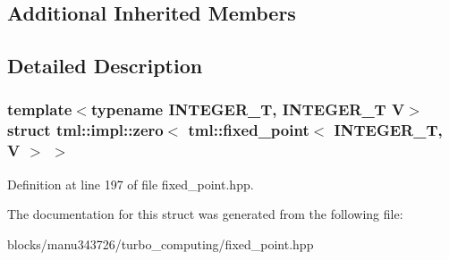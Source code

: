 \subsection*{Additional Inherited Members}


\subsection{Detailed Description}
\subsubsection*{template$<$typename I\+N\+T\+E\+G\+E\+R\+\_\+\+T, I\+N\+T\+E\+G\+E\+R\+\_\+\+T V$>$struct tml\+::impl\+::zero$<$ tml\+::fixed\+\_\+point$<$ I\+N\+T\+E\+G\+E\+R\+\_\+\+T, V $>$ $>$}



Definition at line 197 of file fixed\+\_\+point.\+hpp.



The documentation for this struct was generated from the following file\+:\begin{DoxyCompactItemize}
\item 
blocks/manu343726/turbo\+\_\+computing/fixed\+\_\+point.\+hpp\end{DoxyCompactItemize}
